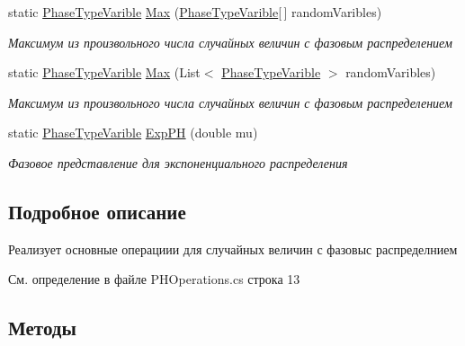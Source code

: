 \begin{DoxyCompactItemize}
static \hyperlink{class_phase_type_distribution_1_1_phase_type_varible}{Phase\+Type\+Varible} \hyperlink{class_phase_type_distribution_1_1_p_h_operations_affa1c7f38acb89a2516a309de42faad8}{Max} (\hyperlink{class_phase_type_distribution_1_1_phase_type_varible}{Phase\+Type\+Varible}\mbox{[}$\,$\mbox{]} random\+Varibles)
\begin{DoxyCompactList}\small\item\em Максимум из произвольного числа случайных величин с фазовым распределением \end{DoxyCompactList}\item 
static \hyperlink{class_phase_type_distribution_1_1_phase_type_varible}{Phase\+Type\+Varible} \hyperlink{class_phase_type_distribution_1_1_p_h_operations_a68bf32c3732edb6df24118b93f75d226}{Max} (List$<$ \hyperlink{class_phase_type_distribution_1_1_phase_type_varible}{Phase\+Type\+Varible} $>$ random\+Varibles)
\begin{DoxyCompactList}\small\item\em Максимум из произвольного числа случайных величин с фазовым распределением \end{DoxyCompactList}\item 
static \hyperlink{class_phase_type_distribution_1_1_phase_type_varible}{Phase\+Type\+Varible} \hyperlink{class_phase_type_distribution_1_1_p_h_operations_ae648d3cec7cf6301115b3f038242fc23}{Exp\+PH} (double mu)
\begin{DoxyCompactList}\small\item\em Фазовое представление для экспоненциального распределения \end{DoxyCompactList}\end{DoxyCompactItemize}


\subsection{Подробное описание}
Реализует основные операциии для случайных величин с фазовыс распределнием 



См. определение в файле P\+H\+Operations.\+cs строка 13



\subsection{Методы}
